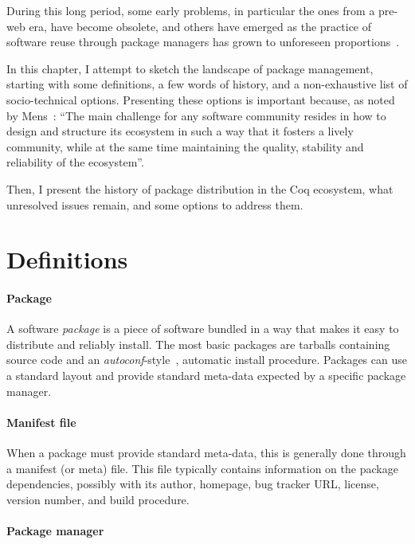During this long period, some early problems, in particular the ones from a pre-web era, have become obsolete, and others have emerged as the practice of software reuse through package managers has grown to unforeseen proportions~\cite{ooms2013possible}.

In this chapter, I attempt to sketch the landscape of package management, starting with some definitions, a few words of history, and a non-exhaustive list of socio-technical options.
Presenting these options is important because, as noted by Mens~\cite{mens2016ecosystemic}:
``The main challenge for any software community resides in how to design and structure its ecosystem in such a way that it fosters a lively community, while at the same time maintaining the quality, stability and reliability of the ecosystem''.

Then, I present the history of package distribution in the Coq ecosystem, what unresolved issues remain, and some options to address them.

\section{Definitions}

\paragraph{Package}

A software \emph{package} is a piece of software bundled in a way that makes it easy to distribute and reliably install.
The most basic packages are tarballs containing source code and an \emph{autoconf}-style~\cite{autoconf}, automatic install procedure.
Packages can use a standard layout and provide standard meta-data expected by a specific package manager.

\paragraph{Manifest file}

When a package must provide standard meta-data, this is generally done through a manifest (or meta) file.
This file typically contains information on the package dependencies, possibly with its author, homepage, bug tracker URL, license, version number, and build procedure.

\paragraph{Package manager}

